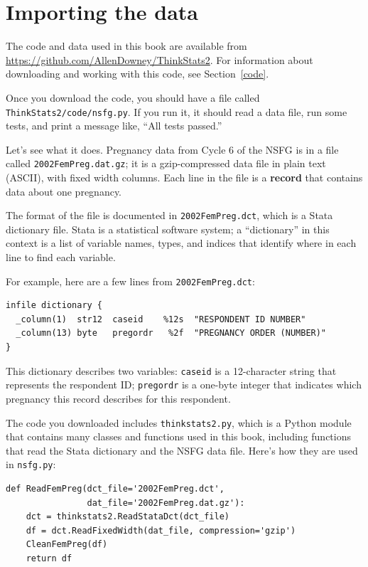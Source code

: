 \documentclass[12pt]{book}
\begin{document}
\section{Importing the data}

The code and data used in this book are available from
\url{https://github.com/AllenDowney/ThinkStats2}.  For information
about downloading and working with this code, 
see Section~\ref{code}.

Once you download the code, you should have a file called
\verb"ThinkStats2/code/nsfg.py".  If you run it, it should read a data
file, run some tests, and print a message like, ``All tests passed.''

Let's see what it does.  Pregnancy data from Cycle 6 of the NSFG is in
a file called \verb"2002FemPreg.dat.gz"; it
is a gzip-compressed data file in plain text (ASCII), with fixed width
columns.  Each line in the file is a {\bf record} that
contains data about one pregnancy.

The format of the file is documented in \verb"2002FemPreg.dct", which
is a Stata dictionary file.  Stata is a statistical software system;
a ``dictionary'' in this context is a list of variable names, types,
and indices that identify where in each line to find each variable.

For example, here are a few lines from \verb"2002FemPreg.dct":
%
\begin{verbatim}
infile dictionary {
  _column(1)  str12  caseid    %12s  "RESPONDENT ID NUMBER"
  _column(13) byte   pregordr   %2f  "PREGNANCY ORDER (NUMBER)"
}
\end{verbatim}

This dictionary describes two variables: \verb"caseid" is a 12-character
string that represents the respondent ID; \verb"pregordr" is a 
one-byte integer that indicates which pregnancy this record
describes for this respondent.

The code you downloaded includes \verb"thinkstats2.py", which is a Python
module
that contains many classes and functions used in this book,
including functions that read the Stata dictionary and
the NSFG data file.  Here's how they are used in \verb"nsfg.py":

\begin{verbatim}
def ReadFemPreg(dct_file='2002FemPreg.dct',
                dat_file='2002FemPreg.dat.gz'):
    dct = thinkstats2.ReadStataDct(dct_file)
    df = dct.ReadFixedWidth(dat_file, compression='gzip')
    CleanFemPreg(df)
    return df
\end{verbatim}
\end{document}
